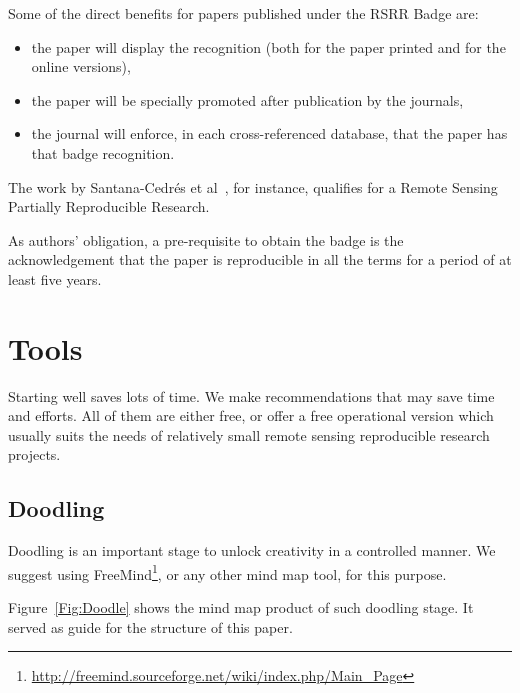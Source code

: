 \documentclass[journal,twoside]{IEEEtran}
\begin{document}
Some of the direct benefits for papers published under the RSRR Badge are:
\begin{itemize}
	\item the paper will display the recognition (both for the paper printed and for the online versions),
	\item the paper will be specially promoted after publication by the journals,
	\item the journal will enforce, in each cross-referenced database, that the paper has that badge recognition.
\end{itemize}

The work by Santana-Cedr\'es et al~\cite{DespecklingPolSARImageswithaStructureTensorFilter2019}, for instance, qualifies for a Remote Sensing Partially Reproducible Research.

As authors' obligation, a pre-requisite to obtain the badge is the acknowledgement that the paper is reproducible in all the terms for a period of at least five years.

\section{Tools}

Starting well saves lots of time.
We make recommendations that may save time and efforts.
All of them are either free, or offer a free operational version which usually suits the needs of relatively small remote sensing reproducible research projects.

\subsection{Doodling}

Doodling is an important stage to unlock creativity in a controlled manner.
We suggest using FreeMind\footnote{\url{http://freemind.sourceforge.net/wiki/index.php/Main_Page}}, or any other mind map tool, for this purpose.

Figure~\ref{Fig:Doodle} shows the mind map product of such doodling stage.
It served as guide for the structure of this paper.
\end{document}
